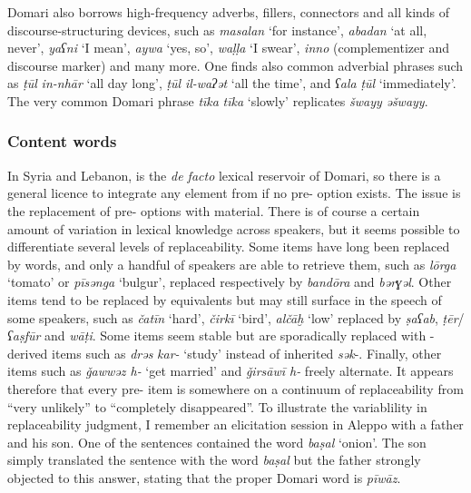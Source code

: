 \documentclass[output=paper]{langsci/langscibook}
\begin{document}
Domari also borrows high-{frequency} adverbs, fillers, connectors and all kinds of discourse-structuring devices, such as \textit{masalan} ‘for instance’, \textit{abadan} ‘at all, never’, \textit{yaʕni}  ‘I mean’, \textit{aywa} ‘yes, so’, \textit{waḷḷa} ‘I swear’, \textit{inno} ({complementizer} and discourse marker) and many more. One finds also common adverbial phrases such as \textit{ṭūl} \textit{in-nhār} ‘all day long’, \textit{ṭūl} \textit{il-waʔət} ‘all the time’, and \textit{ʕala} \textit{ṭūl} ‘immediately’.  The very common Domari phrase \textit{tīka} \textit{tīka} ‘slowly’ replicates  \textit{šwayy} \textit{əšwayy}.


 \subsubsection{Content words}

In Syria and Lebanon,  is the \textit{de facto} lexical reservoir of Domari, so there is a general licence to integrate any element from  if no pre- option exists. The issue is the replacement of pre- options with  material. There is of course a certain amount of variation in lexical knowledge across speakers, but it seems possible to differentiate several levels of {replaceability}. Some items have long been replaced by  words, and only a handful of speakers are able to retrieve them, such as \textit{lōrga} ‘tomato’ or \textit{pīsənga} ‘bulgur’, replaced respectively by  \textit{bandōra} and \textit{bərɣəl}. Other items tend to be replaced by  equivalents but may still surface in the speech of some speakers, such as \textit{čatīn} ‘hard’, \textit{čirkī} ‘bird’, \textit{alčāḫ} ‘low’ replaced by  \textit{ṣaʕab}, \textit{ṭēr}/\textit{ʕaṣfūr} and \textit{wāṭi}. Some items seem stable but are sporadically replaced with -derived items such as \textit{drəs} \textit{kar-} ‘study’ instead of inherited \textit{sək}{}-. Finally, other items  such as \textit{\v{g}awwəz h-} ‘get married’ and \textit{\v{g}irsāwī h-} freely alternate. It appears therefore that every pre- item is somewhere on a continuum of {replaceability} from ``very unlikely'' to ``completely disappeared''. To illustrate the variablility in {replaceability} judgment, I remember an elicitation session in Aleppo with a father and his son. One of the sentences contained the  word \textit{baṣal} ‘onion’. The son simply translated the sentence with the  word \textit{baṣal} but the father strongly objected to this answer, stating that the proper Domari word is \textit{pīwāz}.
\end{document}
